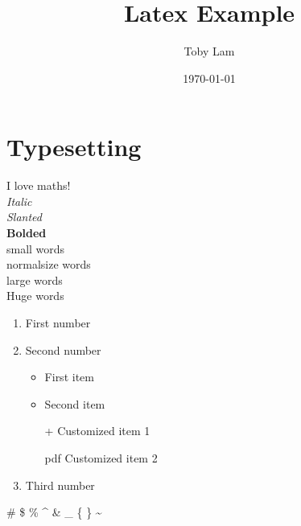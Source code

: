\documentclass[a4paper]{report}
\begin{document}
\title{Latex Example}
\author{Toby Lam}
\date{\today}
\maketitle

\tableofcontents

\newpage

\chapter{Typesetting}
\label{interests}

\indent
\indent
I love maths! \\

\noindent
\textit{Italic} \\
\textsl{Slanted} \\
\textbf{Bolded} \\

\noindent
{\small small words} \\
{\normalsize normalsize words} \\
{\large large words} \\

\vspace{2pt}
\noindent
{\huge Huge \hspace{10pt} words} \\

\normalsize

\begin{enumerate}
	\item First number
	\item Second number
	\begin{itemize}
		\item First item
		\item Second item
		\item[+] Customized item 1
		\item[pdf] Customized item 2
	\end{itemize}
	\item Third number
\end{enumerate}

 \#  \$  \%  \^{} \&  \_  \{  \}  \~{} \\
\end{document}

